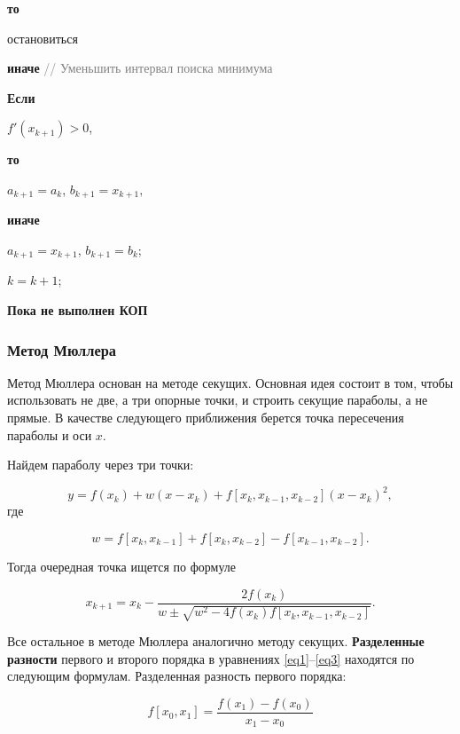 \documentclass[a4paper,12pt]{article}
\begin{document}
\textbf{то}

\quad остановиться

\textbf{иначе} \textcolor{gray}{// Уменьшить интервал поиска минимума}


\quad \textbf{Если}

\quad\quad $ f'(x_{k + 1}) > 0$, 

\quad \textbf{то}

\quad\quad$a_{k + 1} = a_k$, $b_{k + 1} = x_{k + 1},$ 

\quad\textbf{иначе}


\quad\quad$a_{k + 1} = x_{k + 1}$, $b_{k + 1} = b_k$;


$k = k + 1$;


\textbf{Пока не выполнен КОП}


\subsubsection*{Метод Мюллера}


Метод Мюллера основан на методе секущих. Основная идея состоит в том, чтобы использовать не две, а три опорные точки, и строить секущие параболы, а не прямые. В качестве следующего приближения берется точка пересечения параболы и оси $x$.

Найдем параболу через три точки:

\begin{equation}
y = f(x_k) + w(x - x_k)+f[x_k,x_{k-1},x_{k-2}](x - x_k)^2,
\label{eq1}
\end{equation}
где

\begin{equation}
w = f[x_k,x_{k-1}] + f[x_k,x_{k-2}] - f[x_{k-1},x_{k-2}].
\label{eq2}
\end{equation}

Тогда очередная точка ищется по формуле

\begin{equation}
x_{k+1} = x_{k} - \frac{2f(x_k)}{w \pm \sqrt{w^2 - 4f(x_k)f[x_k,x_{k-1},x_{k-2}]}}.
\label{eq3}
\end{equation}

Все остальное в методе Мюллера аналогично методу секущих. \textbf{Разделенные разности} первого и второго порядка в уравнениях \eqref{eq1}--\eqref{eq3} находятся по следующим формулам. Разделенная разность первого порядка:

\begin{equation*}
f[x_0,x_1] = \frac{f(x_1) - f(x_0)}{x_1 - x_0}
\end{equation*}
\end{document}
